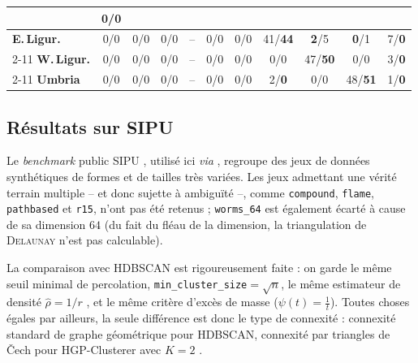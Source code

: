 \begin{table}[htbp]
\begin{tabular}{@{}l*{9}{c}c@{}}
  & {\color[HTML]{C0C0C0}0/0}\\
\midrule
{\color[HTML]{32CB00}\textbf{E.\,Ligur.}}
  & {\color[HTML]{C0C0C0}0/0} & {\color[HTML]{C0C0C0}0/0} & {\color[HTML]{C0C0C0}0/0}
  & -- & {\color[HTML]{C0C0C0}0/0} & {\color[HTML]{C0C0C0}0/0} & 41/\textbf{44}
  & \textbf{2}/5 & \textbf{0}/1 & 7/\textbf{0}\\
\cmidrule(lr){2-11}
{\color[HTML]{34FF34}\textbf{W.\,Ligur.}}
  & {\color[HTML]{C0C0C0}0/0} & {\color[HTML]{C0C0C0}0/0} & {\color[HTML]{C0C0C0}0/0}
  & -- & {\color[HTML]{C0C0C0}0/0} & {\color[HTML]{C0C0C0}0/0} & {\color[HTML]{C0C0C0}0/0}
  & 47/\textbf{50} & {\color[HTML]{C0C0C0}0/0} & 3/\textbf{0}\\
\cmidrule(lr){2-11}
{\color[HTML]{036400}\textbf{Umbria}}
  & {\color[HTML]{C0C0C0}0/0} & {\color[HTML]{C0C0C0}0/0} & {\color[HTML]{C0C0C0}0/0}
  & -- & {\color[HTML]{C0C0C0}0/0} & {\color[HTML]{C0C0C0}0/0} & 2/\textbf{0}
  & {\color[HTML]{C0C0C0}0/0} & 48/\textbf{51} & 1/\textbf{0}\\
\bottomrule
\end{tabular}%
\end{table}

\subsection{Résultats sur SIPU}
\label{subsec:chapV_sipu}

Le \emph{benchmark} public SIPU \cite{Sipu}, utilisé ici \emph{via}  \cite{Clustbench}, regroupe des jeux de données synthétiques de formes et de tailles très variées. Les jeux admettant une vérité terrain multiple -- et donc sujette à ambiguïté --, comme \texttt{compound}, \texttt{flame}, \texttt{pathbased} et \texttt{r15}, n'ont pas été retenus ; \texttt{worms\_64} est également écarté à cause de sa dimension $64$ (du fait du fléau de la dimension, la triangulation de \textsc{Delaunay} n'est pas calculable).

La comparaison avec HDBSCAN \cite{HDBSCAN2017} est rigoureusement faite : on garde le même seuil minimal de percolation, \texttt{min\_cluster\_size}$=\sqrt n$, le même estimateur de densité $\widehat\rho=1/r$%
, et le même critère d'excès de masse ($\psi(t) = \tfrac1t$). Toutes choses égales par ailleurs, la seule différence est donc le type de connexité : connexité standard de graphe géométrique pour HDBSCAN, connexité par triangles de \v Cech pour HGP-Clusterer avec $K=2$ \cite{BibiAppliedNetworkScience}.

